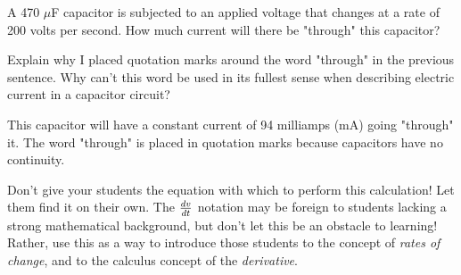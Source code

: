 

A 470 $\mu$F capacitor is subjected to an applied voltage that changes at a rate of 200 volts per second.  How much current will there be "through" this capacitor?

Explain why I placed quotation marks around the word "through" in the previous sentence.  Why can't this word be used in its fullest sense when describing electric current in a capacitor circuit?







This capacitor will have a constant current of 94 milliamps (mA) going "through" it.  The word "through" is placed in quotation marks because capacitors have no continuity.







Don't give your students the equation with which to perform this calculation!  Let them find it on their own.  The ${dv \over dt}$ notation may be foreign to students lacking a strong mathematical background, but don't let this be an obstacle to learning!  Rather, use this as a way to introduce those students to the concept of {\it rates of change}, and to the calculus concept of the {\it derivative}.




